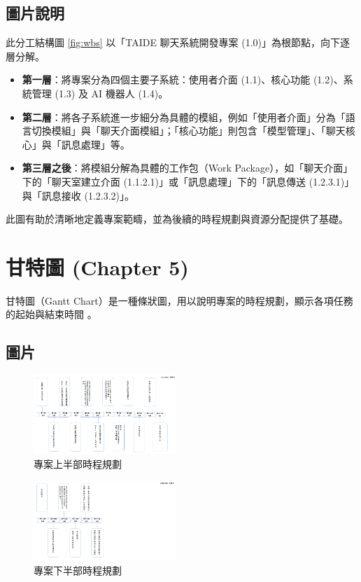 \documentclass[twocolumn,11pt,a4paper]{article}
\begin{document}
\subsection{圖片說明}
此分工結構圖 \ref{fig:wbs} 以「TAIDE 聊天系統開發專案 (1.0)」為根節點，向下逐層分解。
\begin{itemize}
    \item \textbf{第一層}：將專案分為四個主要子系統：使用者介面 (1.1)、核心功能 (1.2)、系統管理 (1.3) 及 AI 機器人 (1.4)。
    \item \textbf{第二層}：將各子系統進一步細分為具體的模組，例如「使用者介面」分為「語言切換模組」與「聊天介面模組」；「核心功能」則包含「模型管理」、「聊天核心」與「訊息處理」等。
    \item \textbf{第三層之後}：將模組分解為具體的工作包（Work Package），如「聊天介面」下的「聊天室建立介面 (1.1.2.1)」或「訊息處理」下的「訊息傳送 (1.2.3.1)」與「訊息接收 (1.2.3.2)」。
\end{itemize}
此圖有助於清晰地定義專案範疇，並為後續的時程規劃與資源分配提供了基礎。

\section{甘特圖 (Chapter 5)}
甘特圖（Gantt Chart）是一種條狀圖，用以說明專案的時程規劃，顯示各項任務的起始與結束時間 \cite{lee2024se}。

\subsection{圖片}
\begin{figure}[htbp]
    \centering
    \includegraphics[width=0.48\textwidth]{res/image/時程圖-1.png}
    \caption{專案上半部時程規劃}
    \label{fig:gantt1}
\end{figure}
\begin{figure}[htbp]
    \centering
    \includegraphics[width=0.48\textwidth]{res/image/時程圖-2.png}
    \caption{專案下半部時程規劃}
    \label{fig:gantt2}
\end{figure}
\FloatBarrier
\end{document}
